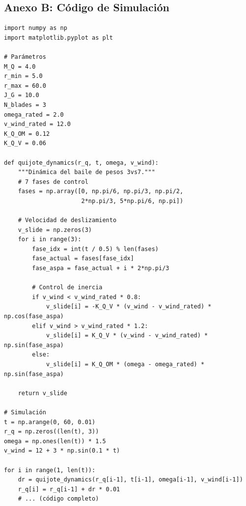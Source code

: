 \documentclass[12pt,a4paper]{article}
\begin{document}
\subsection{Anexo B: Código de Simulación}

\begin{lstlisting}[style=python, caption={Código de simulación del baile 3vs7}]
import numpy as np
import matplotlib.pyplot as plt

# Parámetros
M_Q = 4.0
r_min = 5.0
r_max = 60.0
J_G = 10.0
N_blades = 3
omega_rated = 2.0
v_wind_rated = 12.0
K_Q_OM = 0.12
K_Q_V = 0.06

def quijote_dynamics(r_q, t, omega, v_wind):
    """Dinámica del baile de pesos 3vs7."""
    # 7 fases de control
    fases = np.array([0, np.pi/6, np.pi/3, np.pi/2, 
                      2*np.pi/3, 5*np.pi/6, np.pi])
    
    # Velocidad de deslizamiento
    v_slide = np.zeros(3)
    for i in range(3):
        fase_idx = int(t / 0.5) % len(fases)
        fase_actual = fases[fase_idx]
        fase_aspa = fase_actual + i * 2*np.pi/3
        
        # Control de inercia
        if v_wind < v_wind_rated * 0.8:
            v_slide[i] = -K_Q_V * (v_wind - v_wind_rated) * np.cos(fase_aspa)
        elif v_wind > v_wind_rated * 1.2:
            v_slide[i] = K_Q_V * (v_wind - v_wind_rated) * np.sin(fase_aspa)
        else:
            v_slide[i] = K_Q_OM * (omega - omega_rated) * np.sin(fase_aspa)
    
    return v_slide

# Simulación
t = np.arange(0, 60, 0.01)
r_q = np.zeros((len(t), 3))
omega = np.ones(len(t)) * 1.5
v_wind = 12 + 3 * np.sin(0.1 * t)

for i in range(1, len(t)):
    dr = quijote_dynamics(r_q[i-1], t[i-1], omega[i-1], v_wind[i-1])
    r_q[i] = r_q[i-1] + dr * 0.01
    # ... (código completo)
\end{lstlisting}
\end{document}
